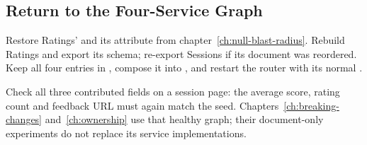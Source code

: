 \subsection{Return to the Four-Service Graph}

Restore Ratings' \code{[Key("id")]} and its \code{[ReferenceResolver]}
attribute from chapter~\ref{ch:null-blast-radius}. Rebuild Ratings and export
its schema; re-export Sessions if its document was reordered. Keep all four
entries in , compose it into , and restart
the router with its normal .

Check all three contributed fields on a session page: the average score,
rating count and feedback URL must again match the seed.
Chapters~\ref{ch:breaking-changes} and~\ref{ch:ownership} use that healthy graph;
their document-only experiments do not replace its service implementations.
%
